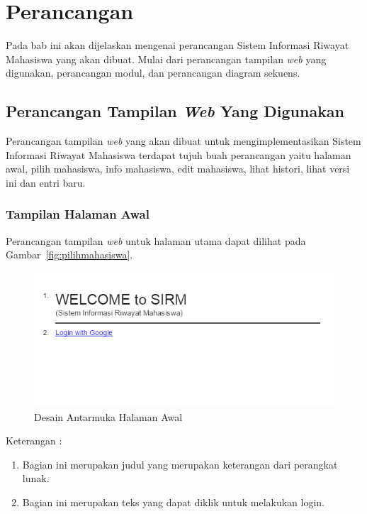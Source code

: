 \chapter{Perancangan}
\label{chap:perancangan}

Pada bab ini akan dijelaskan mengenai perancangan Sistem Informasi Riwayat
Mahasiswa yang akan dibuat. Mulai dari perancangan tampilan {\it web} yang digunakan,
perancangan modul, dan perancangan diagram sekuens.

\section{Perancangan Tampilan {\it Web} Yang Digunakan}
\label{sec:perancanganantarmuka}

Perancangan tampilan {\it web} yang akan dibuat untuk mengimplementasikan Sistem
Informasi Riwayat Mahasiswa terdapat tujuh buah perancangan yaitu halaman
awal, pilih mahasiswa, info mahasiswa, edit mahasiswa, lihat histori, lihat
versi ini dan entri baru.

\subsection{Tampilan Halaman Awal}
Perancangan tampilan {\it web} untuk halaman utama dapat dilihat pada
Gambar~\ref{fig:pilihmahasiswa}.

\begin{figure}[H]
\centering
\includegraphics[scale=0.5]{Gambar/halamanawal.png}
\caption[Desain Antarmuka Halaman Awal]{Desain Antarmuka Halaman Awal}
\label{fig:halamanawal}
\end{figure}

Keterangan :
\begin{enumerate}[(1)]
\item
Bagian ini merupakan judul yang merupakan keterangan dari perangkat lunak.
\item
Bagian ini merupakan teks yang dapat diklik untuk melakukan login.
\end{enumerate}

